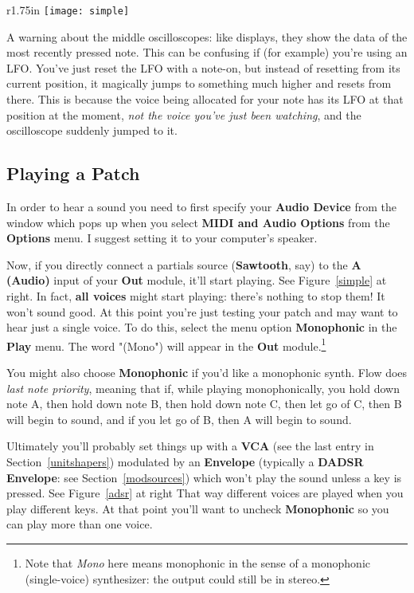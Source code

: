 \documentclass{article}
\begin{document}
\begin{wrapfigure}{r}{1.75in}
\texttt{[image: simple]}
\caption{Playing a Saw wave}
\vspace{-2em}
\label{simple}
\end{wrapfigure}

A warning about the middle oscilloscopes: like displays, they show the data of the most recently pressed note.  This can be confusing if (for example) you're using an LFO.  You've just reset the LFO with a note-on, but instead of resetting from its current position, it magically jumps to something much higher and resets from there.  This is because the voice being allocated for your note has its LFO at that position at the moment, {\it not the voice you've just been watching}, and the oscilloscope suddenly jumped to it.

\subsection{Playing a Patch}
\label{playingapatch}

In order to hear a sound you need to first specify your {\bf Audio Device} from the window which pops up when you select {\bf MIDI and Audio Options} from the {\bf Options} menu.  I suggest setting it to your computer's speaker.

Now, if you directly connect a partials source ({\bf Sawtooth}, say) to the {\bf A (Audio)} input of your {\bf Out} module, it'll start playing.  See Figure~\ref{simple} at right.  In fact, {\bf all voices} might start playing: there's nothing to stop them!  It won't sound good.   At this point you're just testing your patch and may want to hear just a single voice.  To do this, select the menu option {\bf Monophonic} in the {\bf Play} menu.  The word "(Mono") will appear in the {\bf Out} module.\footnote{Note that {\it Mono} here means monophonic in the sense of a monophonic (single-voice) synthesizer: the output could still be in stereo.}

You might also choose {\bf Monophonic} if you'd like a monophonic synth.  Flow does {\it last note priority}, meaning that if, while playing monophonically, you hold down note A, then hold down note B, then hold down note C, then let go of C, then B will begin to sound, and if you let go of B, then A will begin to sound.

Ultimately you'll probably set things up with a {\bf VCA} (see the last entry in Section~\ref{unitshapers}) modulated by an {\bf Envelope} (typically a {\bf DADSR Envelope}: see Section~\ref{modsources}) which won't play the sound unless a key is pressed. See Figure~\ref{adsr} at right That way different voices are played when you play different keys.  At that point you'll want to uncheck {\bf Monophonic} so you can play more than one voice.
\end{document}
